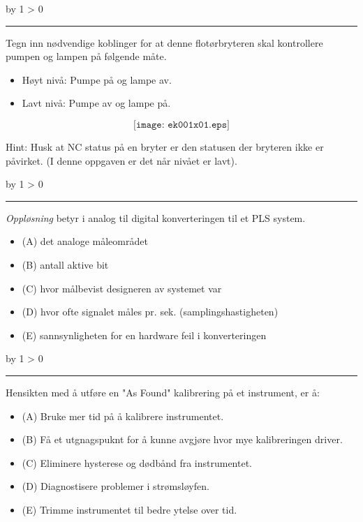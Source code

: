 \documentclass[12pt,a4paper]{article}
\def\oppgave{
            \advance\questnum by 1
            \ifnum \questnum > 0
                 \hrule
                 \vskip 3pt
                 \leftline{Oppgave \the\questnum}
                 \vskip 3pt \fi}
\begin{document}
\vskip 10pt \filbreak 
\oppgave{} 

Tegn inn nødvendige koblinger for at denne flotørbryteren skal kontrollere pumpen og lampen på følgende måte.

\begin{itemize}
\item{} Høyt nivå: Pumpe på og lampe av. 
\item{} Lavt nivå: Pumpe av og lampe på. 
\end{itemize}

$$\texttt{[image: ek001x01.eps]}$$

Hint: Husk at NC status på en bryter er den statusen der bryteren ikke er påvirket. (I denne oppgaven er det når nivået er lavt).


\vskip 10pt \filbreak 
\oppgave{} 

{\it Oppløsning} betyr \underbar{\hskip 50pt} i analog til digital konverteringen til et PLS system. 


\begin{itemize}
\item{(A)} det analoge måleområdet
\vskip 5pt 
\item{(B)} antall aktive bit
\vskip 5pt 
\item{(C)} hvor målbevist designeren av systemet var
\vskip 5pt 
\item{(D)} hvor ofte signalet måles pr. sek. (samplingshastigheten)
\vskip 5pt 
\item{(E)} sannsynligheten for en hardware feil i konverteringen 
\end{itemize}

\vskip 10pt \filbreak 
\oppgave{} 

Hensikten med å utføre en "As Found" kalibrering på et instrument, er å:

\begin{itemize}
\item{(A)} Bruke mer tid på å kalibrere instrumentet. 
\vskip 5pt 
\item{(B)}  Få et utgnagspuknt for å kunne avgjøre hvor mye kalibreringen driver. 
\vskip 5pt 
\item{(C)} Eliminere hysterese og dødbånd fra instrumentet. 
\vskip 5pt 
\item{(D)} Diagnostisere problemer i strømsløyfen.  
\vskip 5pt 
\item{(E)} Trimme instrumentet til bedre ytelse over tid. 
\end{itemize}
\end{document}
